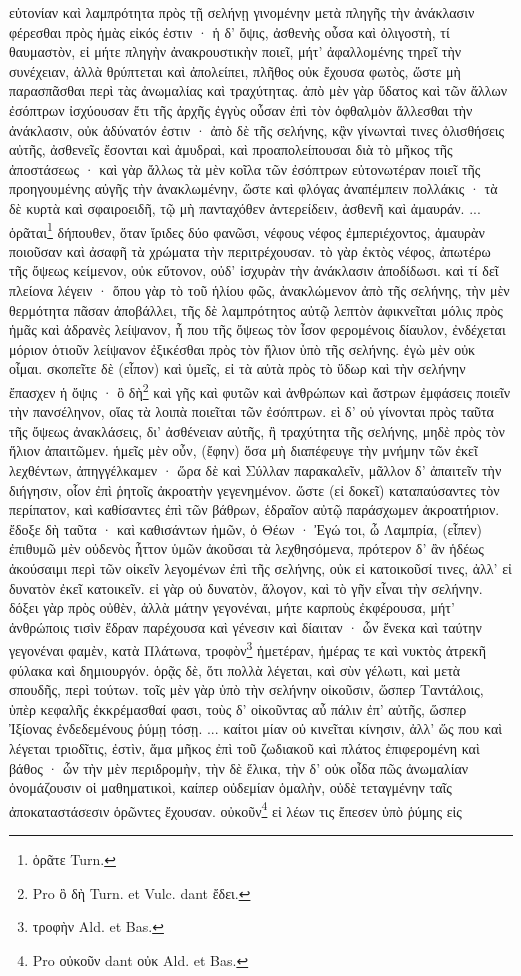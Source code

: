 \documentclass[a4paper, 11pt, oneside, polutonikogreek, german]{article}
\begin{document}
εὐτονίαν καὶ λαμπρότητα πρὸς τῇ σελήνῃ γινομένην μετὰ πληγῆς τὴν ἀνάκλασιν φέρεσθαι πρὸς ἡμὰς εἰκός ἐστιν · ἡ δ' ὄψις, ἀσθενὴς οὖσα καὶ ὀλιγοστὴ, τί θαυμαστὸν, εἰ μήτε πληγὴν ἀνακρουστικὴν ποιεῖ, μήτ' ἀφαλλομένης τηρεῖ τὴν συνέχειαν, ἀλλὰ θρύπτεται καὶ ἀπολείπει, πλῆθος οὐκ ἔχουσα φωτὸς, ὥστε μὴ παρασπᾶσθαι περὶ τὰς ἀνωμαλίας καὶ τραχύτητας. ἀπὸ μὲν γὰρ ὕδατος καὶ τῶν ἄλλων ἐσόπτρων ἰσχύουσαν ἔτι τῆς ἀρχῆς ἐγγὺς οὖσαν ἐπὶ τὸν ὀφθαλμὸν ἅλλεσθαι τὴν ἀνάκλασιν, οὐκ ἀδύνατόν ἐστιν · ἀπὸ δὲ τῆς σελήνης, κᾂν γίνωνταὶ τινες ὀλισθήσεις αὐτῆς, ἀσθενεῖς ἔσονται καὶ ἀμυδραὶ, καὶ προαπολείπουσαι διὰ τὸ μῆκος τῆς ἀποστάσεως · καὶ γὰρ ἄλλως τὰ μὲν κοῖλα τῶν ἐσόπτρων εὐτονωτέραν ποιεῖ τῆς προηγουμένης αὐγῆς τὴν ἀνακλωμένην, ὥστε καὶ φλόγας ἀναπέμπειν πολλάκις · τὰ δὲ κυρτὰ καὶ σφαιροειδῆ, τῷ μὴ πανταχόθεν ἀντερείδειν, ἀσθενῆ καὶ ἀμαυράν. ... ὁρᾶται\footnote{ὁρᾶτε Turn.} δήπουθεν, ὅταν ἴριδες δύο φανῶσι, νέφους νέφος ἐμπεριέχοντος, ἀμαυρὰν ποιοῦσαν καὶ ἀσαφῆ τὰ χρώματα τὴν περιτρέχουσαν. τὸ γὰρ ἐκτὸς νέφος, ἀπωτέρω τῆς ὄψεως κείμενον, οὐκ εὔτονον, οὐδ' ἰσχυρὰν τὴν ἀνάκλασιν ἀποδίδωσι. καὶ τί δεῖ πλείονα λέγειν · ὅπου γὰρ τὸ τοῦ ἡλίου φῶς, ἀνακλώμενον ἀπὸ τῆς σελήνης, τὴν μὲν θερμότητα πᾶσαν ἀποβάλλει, τῆς δὲ λαμπρότητος αὐτῷ λεπτὸν ἀφικνεῖται μόλις πρὸς ἡμᾶς καὶ ἀδρανὲς λείψανον, ἦ που τῆς ὄψεως τὸν ἶσον φερομένοις δίαυλον, ἐνδέχεται μόριον ὁτιοῦν λείψανον ἐξικέσθαι πρὸς τὸν ἥλιον ὑπὸ τῆς σελήνης. ἐγὼ μὲν οὐκ οἶμαι. σκοπεῖτε δὲ (εἶπον) καὶ ὑμεῖς, εἰ τὰ αὐτὰ πρὸς τὸ ὕδωρ καὶ τὴν σελήνην ἔπασχεν ἡ ὄψις · ὃ δὴ\footnote{Pro ὃ δὴ Turn. et Vulc. dant ἔδει.} καὶ γῆς καὶ φυτῶν καὶ ἀνθρώπων καὶ ἄστρων ἐμφάσεις ποιεῖν τὴν πανσέληνον, οἵας τὰ λοιπὰ ποιεῖται τῶν ἐσόπτρων. εὶ δ' οὐ γίνονται πρὸς ταῦτα τῆς ὄψεως ἀνακλάσεις, δι' ἀσθένειαν αὐτῆς, ἢ τραχύτητα τῆς σελήνης, μηδὲ πρὸς τὸν ἥλιον ἀπαιτῶμεν. ἡμεῖς μὲν οὖν, (ἔφην) ὅσα μὴ διαπέφευγε τὴν μνήμην τῶν ἐκεῖ λεχθέντων, ἀπηγγέλκαμεν · ὥρα δὲ καὶ Σύλλαν παρακαλεῖν, μᾶλλον δ' ἀπαιτεῖν τὴν διήγησιν, οἷον ἐπὶ ῥητοῖς ἀκροατὴν γεγενημένον. ὥστε (εἰ δοκεῖ) καταπαύσαντες τὸν περίπατον, καὶ καθίσαντες ἐπὶ τῶν βάθρων, ἑδραῖον αὐτῷ παράσχωμεν ἀκροατήριον. ἔδοξε δὴ ταῦτα · καὶ καθισάντων ἡμῶν, ὁ Θέων · Ἐγώ τοι, ὦ Λαμπρία, (εἶπεν) ἐπιθυμῶ μὲν οὐδενὸς ἧττον ὑμῶν ἀκοῦσαι τὰ λεχθησόμενα, πρότερον δ' ἂν ἡδέως ἀκούσαιμι περὶ τῶν οἰκεῖν λεγομένων ἐπὶ τῆς σελήνης, οὐκ εἰ κατοικοῦσί τινες, ἀλλ' εἰ δυνατὸν ἐκεῖ κατοικεῖν. εἰ γὰρ οὐ δυνατὸν, ἄλογον, καὶ τὸ γῆν εἶναι τὴν σελήνην. δόξει γὰρ πρὸς οὐθὲν, ἀλλὰ μάτην γεγονέναι, μήτε καρποὺς ἐκφέρουσα, μήτ' ἀνθρώποις τισὶν ἕδραν παρέχουσα καὶ γένεσιν καὶ δίαιταν · ὧν ἕνεκα καὶ ταύτην γεγονέναι φαμὲν, κατὰ Πλάτωνα, τροφὸν\footnote{τροφὴν Ald. et Bas.} ἡμετέραν, ἡμέρας τε καὶ νυκτὸς ἀτρεκῆ φύλακα καὶ δημιουργόν. ὁρᾷς δὲ, ὅτι πολλὰ λέγεται, καὶ σὺν γέλωτι, καὶ μετὰ σπουδῆς, περὶ τούτων. τοῖς μὲν γὰρ ὑπὸ τὴν σελήνην οἰκοῦσιν, ὥσπερ Ταντάλοις, ὑπὲρ κεφαλῆς ἐκκρέμασθαί φασι, τοὺς δ' οἰκοῦντας αὖ πάλιν ἐπ' αὐτῆς, ὥσπερ Ἰξίονας ἐνδεδεμένους ῥύμῃ τόσῃ. ... καίτοι μίαν οὐ κινεῖται κίνησιν, ἀλλ' ὥς που καὶ λέγεται τριοδῖτις, ἐστὶν, ἅμα μῆκος ἐπὶ τοῦ ζωδιακοῦ καὶ πλάτος ἐπιφερομένη καὶ βάθος · ὧν τὴν μὲν περιδρομὴν, τὴν δὲ ἕλικα, τὴν δ' οὐκ οἶδα πῶς ἀνωμαλίαν ὀνομάζουσιν οἱ μαθηματικοὶ, καίπερ οὐδεμίαν ὁμαλὴν, οὐδὲ τεταγμένην ταῖς ἀποκαταστάσεσιν ὁρῶντες ἔχουσαν. οὐκοῦν\footnote{Pro οὐκοῦν dant οὐκ Ald. et Bas.} εἰ λέων τις ἔπεσεν ὑπὸ ῥύμης εἰς 
\end{document}
